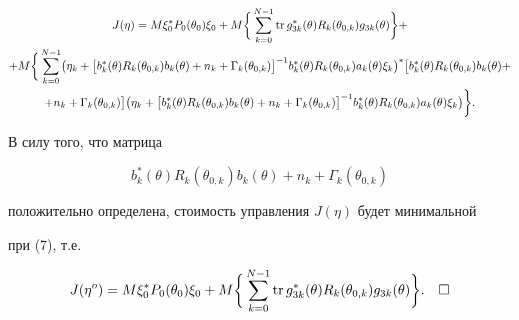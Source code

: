 \begin{gather*}


J(\eta)=M\xi_{0}^{*}P_{0}(\theta_{0})\xi_{0}+


M\biggl\{\,\sum_{k=0}^{N-1}


\tr g_{3k}^{*}(\theta)R_{k}(\theta_{0,k})


g_{3k}(\theta)\biggr\}+ \\


%


+M\biggl\{\,\sum_{k=0}^{N-1}\bigl(\eta_{k}+\bigl[b_{k}^{*}(\theta)


R_{k}(\theta_{0,k})


b_{k}(\theta)+n_{k}+


\Gamma_{k}(\theta_{0,k})\bigr]^{-1}


b_{k}^{*}(\theta)R_{k}(\theta_{0,k})


a_{k}(\theta)\xi_{k}\bigr)^{*}


\bigl[b_{k}^{*}(\theta)R_{k}(\theta_{0,k})


b_{k}(\theta)+\\


+n_{k}+\Gamma_{k}(\theta_{0,k})\bigr]


\bigl(\eta_{k}+\bigl[b_{k}^{*}(\theta)R_{k}(\theta_{0,k})


b_{k}(\theta)+n_{k}+


\Gamma_{k}(\theta_{0,k})\bigr]^{-1}


b_{k}^{*}(\theta)R_{k}(\theta_{0,k})


a_{k}(\theta)\xi_{k}\bigr)\biggr\}.


\end{gather*}


В силу того, что матрица


$$


b_{k}^{*}(\theta)R_{k}(\theta_{0,k})


b_{k}(\theta)+n_{k}+\Gamma_{k}(\theta_{0,k})


$$


положительно определена, стоимость управления $J(\eta)$ будет минимальной


при (7), т.е.


$$


J(\eta^{o})=M\xi_{0}^{*}P_{0}(\theta_{0})\xi_{0}+


M\biggl\{\,\sum_{k=0}^{N-1}


\tr g_{3k}^{*}(\theta)R_{k}(\theta_{0,k})


g_{3k}(\theta)\biggr\}. \quad\square


$$





